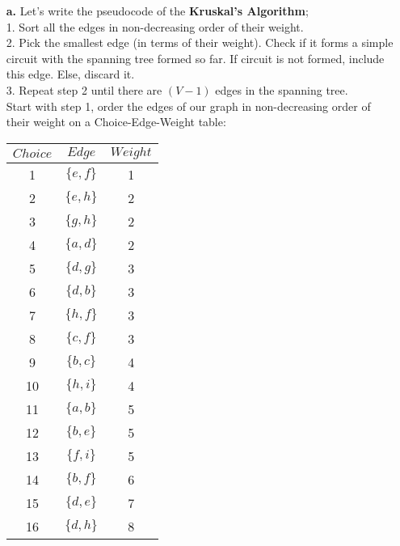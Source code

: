 \documentclass[11pt]{article}
\begin{document}
\begin{itemize}
	\item[\textbf{a.}] 
	Let's write the pseudocode of the \textbf{Kruskal's Algorithm};\\
	1. Sort all the edges in non-decreasing order of their weight.\\
	2. Pick the smallest edge (in terms of their weight). Check if it forms a simple circuit with the spanning tree formed so far. If circuit is not formed, include this edge. Else, discard it.\\
	3. Repeat step 2 until there are $(V-1)$ edges in the spanning tree.\\
\newpage
	Start with step 1, order the edges of our graph in non-decreasing order of their weight on a Choice-Edge-Weight table:\\
	\begin{table}[H]
	\small
	\centering
	\begin{tabular}{|c|c|c|}	
	\hline
	$Choice$ & $Edge$ & $Weight$\\
	\hline 
	1 & $\{e,f\}$ & 1\\			
	2 & $\{e,h\}$ & 2\\	
	3 & $\{g,h\}$ & 2\\	
	4 & $\{a,d\}$ & 2\\	
	5 & $\{d,g\}$ & 3 \\	
	6 & $\{d,b\}$ & 3 \\	
	7 & $\{h,f\}$ & 3 \\	
	8 & $\{c,f\}$ & 3 \\	
	9 & $\{b,c\}$ & 4 \\	
	10& $\{h,i\}$ & 4 \\	
	11& $\{a,b\}$ & 5 \\	
	12& $\{b,e\}$ & 5 \\	
	13& $\{f,i\}$ & 5 \\	
	14& $\{b,f\}$ & 6 \\	
	15& $\{d,e\}$ & 7 \\
	16& $\{d,h\}$ & 8 \\
	\hline 
	\end{tabular}
	\end{table}

\end{itemize}
\end{document}
